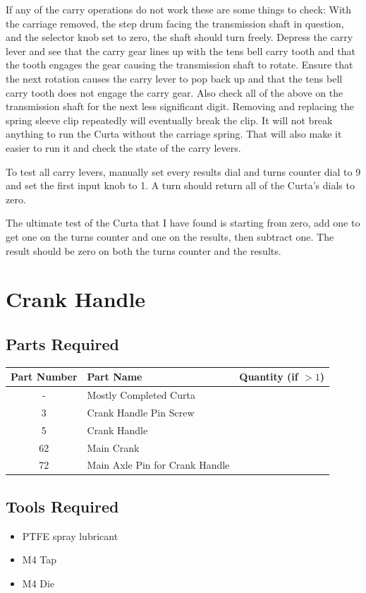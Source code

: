 \documentclass[openany]{book}
\begin{document}
If any of the carry operations do not work these are some things to check:
With the carriage removed, the step drum facing the transmission shaft in question, and the selector knob set to zero, the shaft should turn freely.
Depress the carry lever and see that the carry gear lines up with the tens bell carry tooth and that the tooth engages the gear causing the transmission shaft to rotate.
Ensure that the next rotation causes the carry lever to pop back up and that the tens bell carry tooth does not engage the carry gear.
Also check all of the above on the transmission shaft for the next less significant digit.
Removing and replacing the spring sleeve clip repeatedly will eventually break the clip. It will not break anything to run the Curta without the carriage spring. That will also make it easier to run it and check the state of the carry levers.

To test all carry levers, manually set every results dial and turns counter dial to 9 and set the first input knob to 1. A turn should return all of the Curta’s dials to zero.

The ultimate test of the Curta that I have found is starting from zero, add one to get one on the turns counter and one on the results, then subtract one. The result should be zero on both the turns counter and the results.



\chapter{Crank Handle}
\section{Parts Required}
\begin{table}[!ht]
	\centering
	\begin{tabular}{clc}
		Part Number & Part Name & Quantity (if $>1$) \\ \hline
		- & Mostly Completed Curta & \\
		3 & Crank Handle Pin Screw & \\
		5 & Crank Handle & \\
		62 & Main Crank & \\
		72 & Main Axle Pin for Crank Handle
	\end{tabular}
\end{table}

\section{Tools Required}
\begin{itemize}
	\item PTFE spray lubricant
	\item M4 Tap
	\item M4 Die
\end{itemize}
\end{document}
